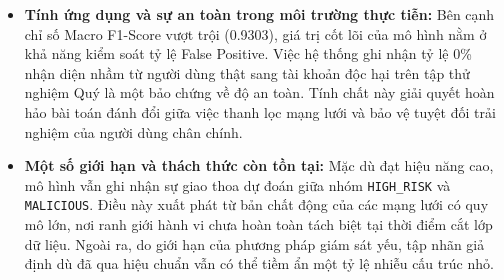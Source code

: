 \begin{itemize}[label={--}, itemsep=1pt]
    \item \textbf{Tính ứng dụng và sự an toàn trong môi trường thực tiễn:} Bên cạnh chỉ số Macro F1-Score vượt trội (0.9303), giá trị cốt lõi của mô hình nằm ở khả năng kiểm soát tỷ lệ False Positive. Việc hệ thống ghi nhận tỷ lệ 0\% nhận diện nhầm từ người dùng thật sang tài khoản độc hại trên tập thử nghiệm Quý là một bảo chứng về độ an toàn. Tính chất này giải quyết hoàn hảo bài toán đánh đổi giữa việc thanh lọc mạng lưới và bảo vệ tuyệt đối trải nghiệm của người dùng chân chính.
    
    \item \textbf{Một số giới hạn và thách thức còn tồn tại:} Mặc dù đạt hiệu năng cao, mô hình vẫn ghi nhận sự giao thoa dự đoán giữa nhóm \texttt{HIGH\_RISK} và \texttt{MALICIOUS}. Điều này xuất phát từ bản chất động của các mạng lưới có quy mô lớn, nơi ranh giới hành vi chưa hoàn toàn tách biệt tại thời điểm cắt lớp dữ liệu. Ngoài ra, do giới hạn của phương pháp giám sát yếu, tập nhãn giả định dù đã qua hiệu chuẩn vẫn có thể tiềm ẩn một tỷ lệ nhiễu cấu trúc nhỏ.
\end{itemize}